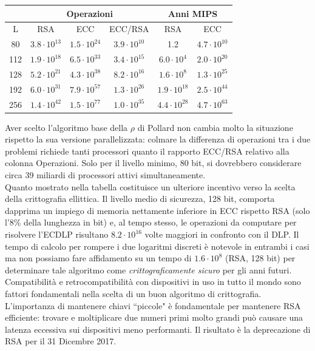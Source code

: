 \documentclass[a4paper,12pt]{tesiinfo}
\begin{document}
\begin{center}
\begin{tabular}{c |c |c |c |c |c }
& \multicolumn{3}{c|}{Operazioni} &\multicolumn{2}{c}{Anni MIPS}\\
\hline
L & RSA & ECC & ECC/RSA & RSA & ECC\\
\hline
80 & $3.8 \cdot 10^{13}$ & $1.5 \cdot 10^{24}$ & $3.9 \cdot 10^{10}$ &  1.2 & $4.7 \cdot 10^{10}$\\
112 & $1.9 \cdot 10^{18}$ & $6.5 \cdot 10^{33}$ & $3.4 \cdot 10^{15}$ &  $6.0 \cdot 10^{4}$ & $2.0 \cdot 10^{20}$\\
128 & $5.2 \cdot 10^{21}$ & $4.3 \cdot 10^{38}$ & $8.2 \cdot 10^{16}$ &  $1.6 \cdot 10^{8}$ & $1.3 \cdot 10^{25}$\\
192 & $6.0 \cdot 10^{31}$ & $7.9 \cdot 10^{57}$ & $1.3 \cdot 10^{26}$ &  $1.9 \cdot 10^{18}$ & $2.5 \cdot 10^{44}$\\
256 & $1.4 \cdot 10^{42}$ & $1.5 \cdot 10^{77}$ & $1.0 \cdot 10^{35}$ &  $4.4 \cdot 10^{28}$ & $4.7 \cdot 10^{63}$
\end{tabular}
\end{center}
Aver scelto l'algoritmo base della $\rho$ di Pollard non cambia molto la situazione rispetto la sua versione parallelizzata: colmare la differenza di operazioni tra i due problemi richiede tanti processori quanto il rapporto ECC/RSA relativo alla colonna Operazioni. Solo per il livello minimo, 80 bit, si dovrebbero considerare circa 39 miliardi di processori attivi simultaneamente. 
\\
Quanto mostrato nella tabella costituisce un ulteriore incentivo verso la scelta della crittografia ellittica. Il livello medio di sicurezza, 128 bit, comporta dapprima un impiego di memoria nettamente inferiore in ECC rispetto RSA (solo l'8\% della lunghezza in bit) e, al tempo stesso, le operazioni da computare per risolvere l'ECDLP risultano $8.2 \cdot 10^{16}$ volte maggiori in confronto con il DLP. Il tempo di calcolo per rompere i due logaritmi discreti \`e notevole in entrambi i casi ma non possiamo fare affidamento su un tempo di $1.6 \cdot 10^{8}$ (RSA, 128 bit) per determinare tale algoritmo come \textit{crittograficamente sicuro} per gli anni futuri. Compatibilit\`a e retrocompatibilit\`a con dispositivi in uso in tutto il mondo sono fattori fondamentali nella scelta di un buon algoritmo di crittografia. L'importanza di mantenere chiavi ``piccole" \`e fondamentale per mantenere RSA efficiente: trovare e moltiplicare due numeri primi molto grandi pu\`o causare una latenza eccessiva sui dispositivi meno performanti. Il risultato \`e la deprecazione di RSA \cite{NIST key lenght} per il 31 Dicembre 2017.
\end{document}
